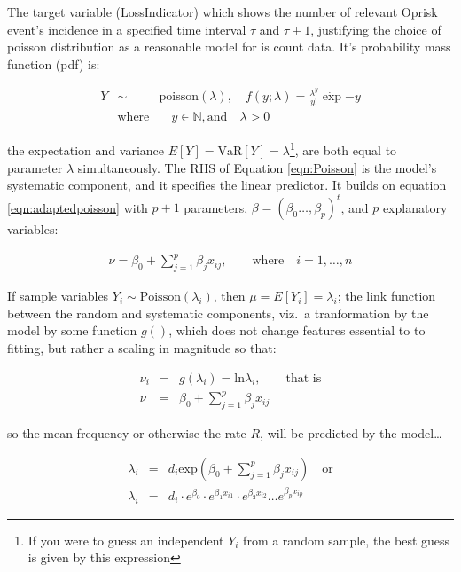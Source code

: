 \documentclass{DissertateUSU}
\begin{document}
The target variable (LossIndicator) which shows the number of relevant
Oprisk event's incidence in a specified time interval \(\tau\) and
\(\tau+1\), justifying the choice of poisson distribution as a
reasonable model for is count data. It's probability mass function (pdf)
is:

\singlespacing

\begin{eqnarray}\label{eqn:Poisson}
Y &\sim& \mbox{poisson}(\lambda), \quad f(y;\lambda) = \frac{\lambda^y}{y!}\dot\exp{-y}\\
 &\mbox{where}& \quad y \in  \mathbb{N}, \mbox{and} \quad \lambda > 0 \nonumber
\end{eqnarray} \doublespacing

the expectation and variance
\(E[Y] = \mbox{VaR}[Y] = \lambda\)\footnote{If you were to guess an independent $Y_i$ from a random sample, the best guess is given by this expression},
are both equal to parameter \(\lambda\) simultaneously. The RHS of
Equation \ref{eqn:Poisson} is the model's systematic component, and it
specifies the linear predictor. It builds on equation
\ref{eqn:adaptedpoisson} with \(p+1\) parameters,
\(\beta = (\beta_0\ldots,\beta_p)^t\), and \(p\) explanatory variables:

\singlespacing

\begin{eqnarray}
\nu = \beta_0 + \sum_{j=1}^{p}\beta_jx_{ij}, \qquad \mbox{where} \quad i = 1,\ldots,n
\end{eqnarray} \doublespacing

If sample variables \(Y_i \sim \mbox{Poisson}(\lambda_i)\), then
\(\mu = E[Y_i] = \lambda_i\); the link function between the random and
systematic components, viz.~a tranformation by the model by some
function \(g()\), which does not change features essential to to
fitting, but rather a scaling in magnitude so that:

\singlespacing

\begin{eqnarray}\label{eqn:linkfcn }
\nu_i &=& g(\lambda_i) = \mbox{ln}\lambda_i, \qquad \mbox{that is} \nonumber \\
\nu &=& \beta_0 + \sum_{j=1}^{p}\beta_jx_{ij}
\end{eqnarray} \doublespacing

so the mean frequency or otherwise the rate \(R\), will be predicted by
the model\ldots

\singlespacing

\begin{eqnarray}\label{eqn:multmodel}
\lambda_i &=& d_i\mbox{exp}(\beta_0 + \sum_{j=1}^{p}\beta_jx_{ij}) \quad \mbox{or} \nonumber \\
\lambda_i &=& d_i\cdot e^{\beta_0}\cdot e^{\beta_1x_{i1}}\cdot e^{\beta_2x_{i2}} \ldots e^{\beta_px_{ip}}
\end{eqnarray} \doublespacing
\end{document}
